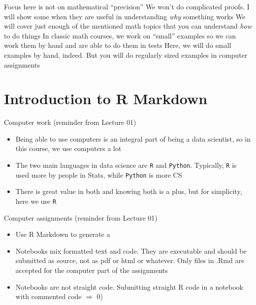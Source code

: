 \documentclass[aspectratio=169]{beamer}\usepackage[]{graphicx}\usepackage[]{xcolor}
\begin{document}
\begin{frame}{Focus here is not on mathematical ``precision''}
\bbullet We won't do complicated proofs. I will show some when they are useful in understanding \textit{why} something works
\vfill
\bbullet We will cover just enough of the mentioned math topics that you can understand \textit{how} to do things
\vfill
\bbullet In classic math courses, we work on ``small'' examples so we can work them by hand and are able to do them in tests
\vfill
Here, we will do small examples by hand, indeed. But you will do regularly sized examples in computer assignments
\end{frame}


\section{Introduction to R Markdown}


\begin{frame}{Computer work (reminder from Lecture 01)}
\begin{itemize}
\item Being able to use computers is an integral part of being a data scientist, so in this course, we use computers a lot
\vfill
\item The two main languages in data science are \texttt{R} and \texttt{Python}. Typically, \texttt{R} is used more by people in Stats, while \texttt{Python} is more CS
\vfill
\item There is great value in both and knowing both is a plus, but for simplicity, here we use \texttt{R}
\end{itemize}
\end{frame}

\begin{frame}{Computer assignments (reminder from Lecture 01)}
\begin{itemize}
\item Use R Markdown to generate a 
\vfill
\item Notebooks mix formatted text and code. They are executable and should be submitted as source, not as pdf or html or whatever. Only files in .Rmd are accepted for the computer part of the assignments
\vfill
\item Notebooks are not straight code. Submitting straight R code in a notebook with commented code $\Rightarrow$ 0)
\end{itemize}
\end{frame}
\end{document}
